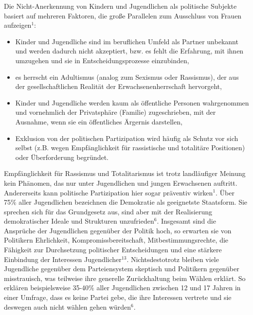 {Die Nicht-Anerkennung von Kindern und Jugendlichen als politische Subjekte basiert auf mehreren Faktoren, die große Parallelen zum Ausschluss von Frauen aufzeigen$^1$:

\begin{itemize}
\item Kinder und Jugendliche sind im beruflichen Umfeld als Partner unbekannt und werden dadurch nicht akzeptiert, bzw. es fehlt die Erfahrung, mit ihnen umzugehen und sie in Entscheidungsprozesse einzubinden,
\item es herrscht ein Adultismus (analog zum Sexismus oder Rassismus), der aus der gesellschaftlichen Realität der Erwachsenenherrschaft hervorgeht,
\item Kinder und Jugendliche werden kaum als öffentliche Personen wahrgenommen und vornehmlich der Privatsphäre (Familie) zugeschrieben, mit der Ausnahme, wenn sie ein öffentliches Ärgernis darstellen,
\item Exklusion von der politischen Partizipation wird häufig als {\Gu}Schutz{\Go} vor sich selbst (z.B. wegen Empfänglichkeit für rassistische und totalitäre Positionen) oder Überforderung begründet.
\end{itemize}

Empfänglichkeit für Rassismus und Totalitarismus ist trotz landläufiger Meinung kein Phänomen, das nur unter Jugendlichen und jungen Erwachsenen auftritt. Andererseits kann politische Partizipation hier sogar präventiv wirken$^1$. Über 75\% aller Jugendlichen bezeichnen die Demokratie als geeignetste Staatsform. Sie sprechen sich für das Grundgesetz aus, sind aber mit der Realisierung demokratischer Ideale und Strukturen unzufrieden$^6$. Insgesamt sind die Ansprüche der Jugendlichen gegenüber der Politik hoch, so erwarten sie von Politikern Ehrlichkeit, Kompromissbereitschaft, Mitbestimmungsrechte, die Fähigkeit zur Durchsetzung politischer Entscheidungen und eine stärkere Einbindung der Interessen Jugendlicher$^{13}$. Nichtsdestotrotz bleiben viele Jugendliche gegenüber dem Parteiensystem skeptisch und Politikern gegenüber misstrauisch, was teilweise ihre generelle Zurückhaltung beim Wählen erklärt. So erklären beispielsweise 35-40\% aller Jugendlichen zwischen 12 und 17 Jahren in einer Umfrage, dass es keine Partei gebe, die ihre Interessen vertrete und sie deswegen auch nicht wählen gehen würden$^6$.

}
